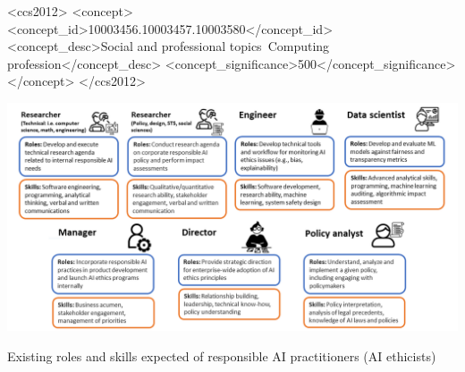 \documentclass[sigconf]{acmart}
\begin{document}
\begin{CCSXML}
<ccs2012>
   <concept>
       <concept_id>10003456.10003457.10003580</concept_id>
       <concept_desc>Social and professional topics~Computing profession</concept_desc>
       <concept_significance>500</concept_significance>
       </concept>
 </ccs2012>
\end{CCSXML}


\begin{teaserfigure}
  \includegraphics[width=\textwidth]{teaserAIcomp.png}
  \caption{Existing roles and skills expected of responsible AI practitioners (AI ethicists)}
    \label{fig:teaser}
\end{teaserfigure}


\maketitle
\end{document}
